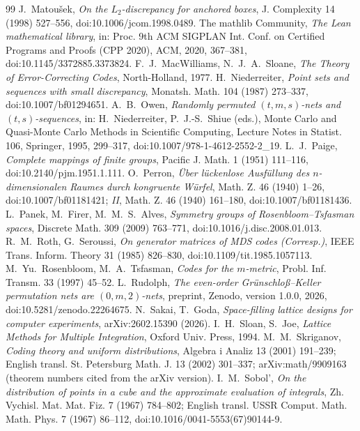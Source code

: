 \documentclass[11pt]{amsart}
\theoremstyle{definition}
\theoremstyle{plain}
\begin{document}
\begin{thebibliography}{99}
 J.~Matou\v sek, \emph{On the $L_2$-discrepancy for anchored boxes}, J. Complexity 14 (1998) 527--556, doi:10.1006/jcom.1998.0489.
 The mathlib Community, \emph{The Lean mathematical library}, in: Proc. 9th ACM SIGPLAN Int. Conf. on Certified Programs and Proofs (CPP 2020), ACM, 2020, 367--381, doi:10.1145/3372885.3373824.
 F.~J.~MacWilliams, N.~J.~A.~Sloane, \emph{The Theory of Error-Correcting Codes}, North-Holland, 1977.
 H.~Niederreiter, \emph{Point sets and sequences with small discrepancy}, Monatsh. Math. 104 (1987) 273--337, doi:10.1007/bf01294651.
 A.~B.~Owen, \emph{Randomly permuted $(t,m,s)$-nets and $(t,s)$-sequences}, in: H.~Niederreiter, P.~J.-S.~Shiue (eds.), Monte Carlo and Quasi-Monte Carlo Methods in Scientific Computing, Lecture Notes in Statist. 106, Springer, 1995, 299--317, doi:10.1007/978-1-4612-2552-2\_19.
 L.~J.~Paige, \emph{Complete mappings of finite groups}, Pacific J. Math. 1 (1951) 111--116, doi:10.2140/pjm.1951.1.111.
 O.~Perron, \emph{\"Uber l\"uckenlose Ausf\"ullung des $n$-dimensionalen Raumes durch kongruente W\"urfel}, Math. Z. 46 (1940) 1--26, doi:10.1007/bf01181421; \emph{II}, Math. Z. 46 (1940) 161--180, doi:10.1007/bf01181436.
 L.~Panek, M.~Firer, M.~M.~S.~Alves, \emph{Symmetry groups of Rosenbloom--Tsfasman spaces}, Discrete Math. 309 (2009) 763--771, doi:10.1016/j.disc.2008.01.013.
 R.~M.~Roth, G.~Seroussi, \emph{On generator matrices of MDS codes (Corresp.)}, IEEE Trans. Inform. Theory 31 (1985) 826--830, doi:10.1109/tit.1985.1057113.
 M.~Yu.~Rosenbloom, M.~A.~Tsfasman, \emph{Codes for the $m$-metric}, Probl. Inf. Transm. 33 (1997) 45--52.
 L.~Rudolph, \emph{The even-order Gr\"unschlo{\ss}--Keller permutation nets are $(0,m,2)$-nets}, preprint, Zenodo, version 1.0.0, 2026, doi:10.5281/zenodo.22264675.
 N.~Sakai, T.~Goda, \emph{Space-filling lattice designs for computer experiments}, arXiv:2602.15390 (2026).
 I.~H.~Sloan, S.~Joe, \emph{Lattice Methods for Multiple Integration}, Oxford Univ. Press, 1994.
 M.~M.~Skriganov, \emph{Coding theory and uniform distributions}, Algebra i Analiz 13 (2001) 191--239; English transl. St. Petersburg Math. J. 13 (2002) 301--337; arXiv:math/9909163 (theorem numbers cited from the arXiv version).
 I.~M.~Sobol', \emph{On the distribution of points in a cube and the approximate evaluation of integrals}, Zh. Vychisl. Mat. Mat. Fiz. 7 (1967) 784--802; English transl. USSR Comput. Math. Math. Phys. 7 (1967) 86--112, doi:10.1016/0041-5553(67)90144-9.

\end{thebibliography}
\end{document}
